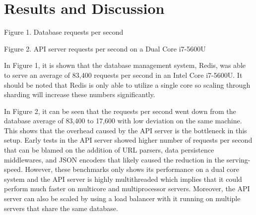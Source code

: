 \documentclass{sigchi}
\begin{document}
\section{Results and Discussion}
\begin{center}
  Figure 1. Database requests per second
\end{center}
\begin{center}
  Figure 2. API server requests per second on a Dual Core i7-5600U
\end{center}

In Figure 1, it is shown that the database management system, Redis, was able to serve an average of 83,400
requests per second in an Intel Core i7-5600U. It should be noted that Redis is only able to utilize a single core
so scaling through sharding will increase these numbers significantly. 

In Figure 2, it can be seen that the requests per second went down
from the database average of 83,400 to 17,600 with low deviation on the same machine.
This shows that the overhead caused by the API server is the bottleneck in this setup. 
Early tests in the API server showed higher number of requests per second
that can be blamed on the addition of URL parsers, data persistence middlewares, and JSON encoders
that likely caused the reduction in the serving-speed. However, these benchmarks only shows its performance
on a dual core system and the API server is highly multithreaded which implies that it could perform much faster
on multicore and multiprocessor servers. Moreover, the API server can also be scaled by using a load balancer
with it running on multiple servers that share the same database. 
\end{document}
